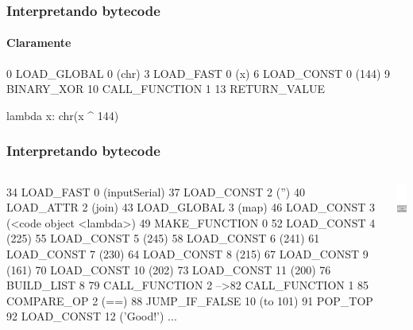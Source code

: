 \documentclass[9pt, notes=hide]{beamer}
\begin{document}
\begin{frame}[fragile]
    \frametitle{Interpretando bytecode}
    \framesubtitle{Claramente}

\begin{python}
   0  LOAD_GLOBAL          0 (chr)
   3  LOAD_FAST            0 (x)
   6  LOAD_CONST           0 (144)
   9  BINARY_XOR
  10 CALL_FUNCTION         1
  13 RETURN_VALUE
\end{python}

\vspace{0.5cm}

\begin{python}
    lambda x: chr(x ^ 144)
\end{python}

\end{frame}


\begin{frame}[fragile]
    \frametitle{Interpretando bytecode}
        \begin{columns}[T]
            \begin{column}{.8\textwidth}
\begin{python}
   34  LOAD_FAST          0 (inputSerial)
   37  LOAD_CONST         2 ('')
   40  LOAD_ATTR          2 (join)
   43  LOAD_GLOBAL        3 (map)
   46  LOAD_CONST         3 (<code object <lambda>)
   49  MAKE_FUNCTION      0
   52  LOAD_CONST         4 (225)
   55  LOAD_CONST         5 (245)
   58  LOAD_CONST         6 (241)
   61  LOAD_CONST         7 (230)
   64  LOAD_CONST         8 (215)
   67  LOAD_CONST         9 (161)
   70  LOAD_CONST        10 (202)
   73  LOAD_CONST        11 (200)
   76  BUILD_LIST         8
   79  CALL_FUNCTION      2
-->82  CALL_FUNCTION      1
   85  COMPARE_OP         2 (==)
   88  JUMP_IF_FALSE     10 (to 101)
   91  POP_TOP
   92  LOAD_CONST        12 ('Good!')
   ...
\end{python}

            \end{column}
            \begin{column}{.3\textwidth}
                \includegraphics[width=2.5cm]{images/stack-4.png}
            \end{column}
        \end{columns}

\end{frame}
\end{document}
